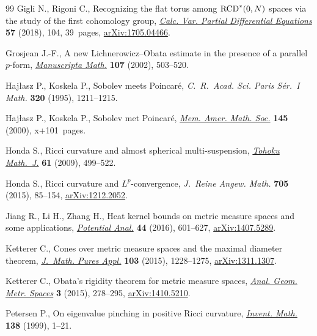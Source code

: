 \documentclass[10pt,a4paper]{amsart}
\numberwithin{equation}{section}
\theoremstyle{definition}
\begin{document}
\begin{thebibliography}{99}
Gigli N., Rigoni C., Recognizing the flat torus among {${\rm RCD}^*(0,N)$}
 spaces via the study of the first cohomology group, \href{https://doi.org/10.1007/s00526-018-1377-z}{\textit{Calc. Var.
 Partial Differential Equations}} \textbf{57} (2018), 104, 39~pages,
 \href{https://arxiv.org/abs/1705.04466}{arXiv:1705.04466}.

Grosjean J.-F., A new {L}ichnerowicz--{O}bata estimate in the presence of a
 parallel {$p$}-form, \href{https://doi.org/10.1007/s002290200248}{\textit{Manuscripta Math.}} \textbf{107} (2002),
 503--520.

Haj{\l}asz P., Koskela P., Sobolev meets {P}oincar\'e, \textit{C.~R.~Acad. Sci.
 Paris S\'er.~I Math.} \textbf{320} (1995), 1211--1215.

Haj{\l}asz P., Koskela P., Sobolev met {P}oincar\'e, \href{https://doi.org/10.1090/memo/0688}{\textit{Mem. Amer. Math.
 Soc.}} \textbf{145} (2000), x+101~pages.

Honda S., Ricci curvature and almost spherical multi-suspension, \href{https://doi.org/10.2748/tmj/1264084497}{\textit{Tohoku
 Math.~J.}} \textbf{61} (2009), 499--522.

Honda S., Ricci curvature and {$L^p$}-convergence, \textit{J.~Reine Angew.
 Math.} \textbf{705} (2015), 85--154, \href{https://arxiv.org/abs/1212.2052}{arXiv:1212.2052}.

Jiang R., Li H., Zhang H., Heat kernel bounds on metric measure spaces and some
 applications, \href{https://doi.org/10.1007/s11118-015-9521-2}{\textit{Potential Anal.}} \textbf{44} (2016), 601--627,
 \href{https://arxiv.org/abs/1407.5289}{arXiv:1407.5289}.

Ketterer C., Cones over metric measure spaces and the maximal diameter theorem,
 \href{https://doi.org/10.1016/j.matpur.2014.10.011}{\textit{J.~Math. Pures Appl.}} \textbf{103} (2015), 1228--1275,
 \href{https://arxiv.org/abs/1311.1307}{arXiv:1311.1307}.

Ketterer C., Obata's rigidity theorem for metric measure spaces, \href{https://doi.org/10.1515/agms-2015-0016}{\textit{Anal.
 Geom. Metr. Spaces}} \textbf{3} (2015), 278--295, \href{https://arxiv.org/abs/1410.5210}{arXiv:1410.5210}.

Petersen P., On eigenvalue pinching in positive {R}icci curvature,
 \href{https://doi.org/10.1007/s002220050339}{\textit{Invent. Math.}} \textbf{138} (1999), 1--21.


\end{thebibliography}
\end{document}
